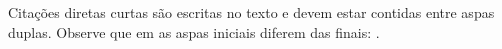 Citações diretas curtas são escritas no texto e devem estar contidas entre aspas duplas.
Observe que em  as aspas iniciais diferem das finais: .

